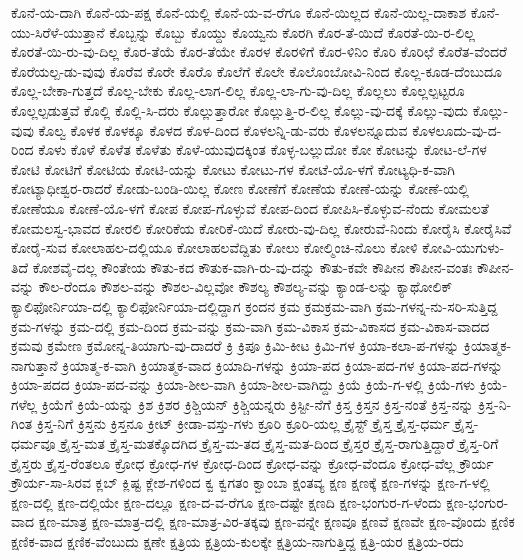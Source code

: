ಕೊನೆ-ಯ-ದಾಗಿ
ಕೊನೆ-ಯ-ಪಕ್ಷ
ಕೊನೆ-ಯಲ್ಲಿ
ಕೊನೆ-ಯ-ವ-ರೆಗೂ
ಕೊನೆ-ಯಿಲ್ಲದ
ಕೊನೆ-ಯಿಲ್ಲ-ದಾಕಾಶ
ಕೊನೆ-ಯು-ಸಿರೆಳೆ-ಯುತ್ತಾನೆ
ಕೊಬ್ಬನ್ನು
ಕೊಬ್ಬು
ಕೊಯ್ದು
ಕೊಯ್ವನು
ಕೊರಗಿ
ಕೊರ-ತೆ-ಯಿದೆ
ಕೊರತೆ-ಯಿ-ರ-ಲಿಲ್ಲ
ಕೊರತೆ-ಯಿ-ರು-ವು-ದಿಲ್ಲ
ಕೊರ-ತೆಯೆ
ಕೊರ-ತೆಯೇ
ಕೊರಳ
ಕೊರಳಿಗೆ
ಕೊರ-ಳಿನಿಂ
ಕೊರಿ
ಕೊರಿಛೆ
ಕೊರೆತ-ವೆಂದರೆ
ಕೊರೆಯಲ್ಪ-ಡು-ವುವು
ಕೊರೆವ
ಕೊರೇ
ಕೊರೊ
ಕೊಲೆಗೆ
ಕೊಲೇ
ಕೊಲೊಂಬೋವಿ-ನಿಂದ
ಕೊಲ್ಲ-ಕೂಡ-ದೆಂಬುದೂ
ಕೊಲ್ಲ-ಬೇಕಾ-ಗುತ್ತದೆ
ಕೊಲ್ಲ-ಬೇಕು
ಕೊಲ್ಲ-ಲಾಗ-ಲಿಲ್ಲ
ಕೊಲ್ಲ-ಲಾ-ಗು-ವು-ದಿಲ್ಲ
ಕೊಲ್ಲಲು
ಕೊಲ್ಲಲ್ಪಟ್ಟರೂ
ಕೊಲ್ಲಲ್ಪಡುತ್ತವೆ
ಕೊಲ್ಲಿ
ಕೊಲ್ಲಿ-ಸಿ-ದರು
ಕೊಲ್ಲುತ್ತಾರೋ
ಕೊಲ್ಲುತ್ತಿ-ರ-ಲಿಲ್ಲ
ಕೊಲ್ಲು-ವು-ದಕ್ಕೆ
ಕೊಲ್ಲು-ವುದು
ಕೊಲ್ಲು-ವುವು
ಕೊಲ್ವ
ಕೊಳಕ
ಕೊಳಕ್ಕೂ
ಕೊಳದ
ಕೊಳ-ದಿಂದ
ಕೊಳಲನ್ನಿ-ಡು-ವರು
ಕೊಳಲನ್ನೂದುವ
ಕೊಳಲೂದು-ವು-ದ-ರಿಂದ
ಕೊಳು
ಕೊಳೆ
ಕೊಳೆತ
ಕೊಳೆತು
ಕೊಳೆ-ಯುವುದಕ್ಕಿಂತ
ಕೊಳ್ಳ-ಬಲ್ಲುದೋ
ಕೋ
ಕೋಟನ್ನು
ಕೋಟ-ಲೆ-ಗಳ
ಕೋಟಿ
ಕೋಟಿಗೆ
ಕೋಟಿಯ
ಕೋಟಿ-ಯನ್ನು
ಕೋಟು
ಕೋಟು-ಗಳ
ಕೋಟೆ-ಯೊ-ಳಗೆ
ಕೋಟ್ಯಧಿ-ಕ-ವಾಗಿ
ಕೋಟ್ಯಾಧೀಶ್ವರ-ರಾದರೆ
ಕೋಡು-ಬಂಡಿ-ಯಿಲ್ಲ
ಕೋಣ
ಕೋಣೆಗೆ
ಕೋಣೆಯ
ಕೋಣೆ-ಯನ್ನು
ಕೋಣೆ-ಯಲ್ಲಿ
ಕೋಣೆಯೂ
ಕೋಣೆ-ಯೊ-ಳಗೆ
ಕೋಪ
ಕೋಪ-ಗೊಳ್ಳುವೆ
ಕೋಪ-ದಿಂದ
ಕೋಪಿಸಿ-ಕೊಳ್ಳುವ-ನೆಂದು
ಕೋಮಲತೆ
ಕೋಮಲಸ್ವ-ಭಾವದ
ಕೋರಲಿ
ಕೋರಿಕೆಯ
ಕೋರಿಕೆ-ಯಿದೆ
ಕೋರು-ವು-ದಿಲ್ಲ
ಕೋರುವೆ-ನಿಂದು
ಕೋರೈಸಿ
ಕೋರೈಸಿವೆ
ಕೋರೈ-ಸುವ
ಕೋಲಾಹಲ-ದಲ್ಲಿಯೂ
ಕೋಲಾಹಲವೆದ್ದಿತು
ಕೋಲು
ಕೋಲ್ಮಿಂಚಿ-ನೊಲು
ಕೋಳಿ
ಕೋವಿ-ಯುಗುಳು-ತಿದೆ
ಕೋಶವೈ-ದಲ್ಲ
ಕೌಂತೇಯ
ಕೌತು-ಕದ
ಕೌತುಕ-ವಾಗಿ-ರು-ವು-ದನ್ನು
ಕೌತು-ಕವೇ
ಕೌಪೀನ
ಕೌಪೀನ-ವಂತಃ
ಕೌಪೀನ-ವನ್ನು
ಕೌಲ-ರೆಂದೂ
ಕೌಶಲ-ವನ್ನು
ಕೌಶಲ-ವಿಲ್ಲವೋ
ಕೌಶಲ್ಯ
ಕೌಶಲ್ಯ-ವನ್ನು
ಕ್ಯಾಂಡ-ಲನ್ನು
ಕ್ಯಾಥೋಲಿಕ್
ಕ್ಯಾಲಿಫೋರ್ನಿಯಾ-ದಲ್ಲಿ
ಕ್ಯಾಲಿಫೋರ್ನಿಯಾ-ದಲ್ಲಿದ್ದಾಗ
ಕ್ರಂದನ
ಕ್ರಮ
ಕ್ರಮಕ್ರಮ-ವಾಗಿ
ಕ್ರಮ-ಗಳನ್ನ-ನು-ಸರಿ-ಸುತ್ತಿದ್ದ
ಕ್ರಮ-ಗಳನ್ನು
ಕ್ರಮ-ದಲ್ಲಿ
ಕ್ರಮ-ದಿಂದ
ಕ್ರಮ-ವನ್ನು
ಕ್ರಮ-ವಾಗಿ
ಕ್ರಮ-ವಿಕಾಸ
ಕ್ರಮ-ವಿಕಾಸದ
ಕ್ರಮ-ವಿಕಾಸ-ವಾದದ
ಕ್ರಮವು
ಕ್ರಮೇಣ
ಕ್ರಮೋನ್ನ-ತಿಯಾಗು-ವು-ದಾದರೆ
ಕ್ರಿ
ಕ್ರಿಪೂ
ಕ್ರಿಮಿ-ಕೀಟ
ಕ್ರಿಮಿ-ಗಳ
ಕ್ರಿಯಾ-ಕಲಾ-ಪ-ಗಳನ್ನು
ಕ್ರಿಯಾತ್ಮಕ-ನಾಗುತ್ತಾನೆ
ಕ್ರಿಯಾತ್ಮ-ಕ-ವಾಗಿ
ಕ್ರಿಯಾತ್ಮಕ-ವಾದ
ಕ್ರಿಯಾದಿ-ಗಳನ್ನು
ಕ್ರಿಯಾ-ಪದ
ಕ್ರಿಯಾ-ಪದ-ಗಳ
ಕ್ರಿಯಾ-ಪದ-ಗಳನ್ನು
ಕ್ರಿಯಾ-ಪದದ
ಕ್ರಿಯಾ-ಪದ-ವನ್ನು
ಕ್ರಿಯಾ-ಶೀಲ-ವಾಗಿ
ಕ್ರಿಯಾ-ಶೀಲ-ವಾಗಿದ್ದು
ಕ್ರಿಯೆ
ಕ್ರಿಯೆ-ಗ-ಳಲ್ಲಿ
ಕ್ರಿಯೆ-ಗಳು
ಕ್ರಿಯೆ-ಗಳೆಲ್ಲ
ಕ್ರಿಯೆಗೆ
ಕ್ರಿಯೆ-ಯನ್ನು
ಕ್ರಿಶ
ಕ್ರಿಶರ
ಕ್ರಿಶ್ಚಿಯನ್
ಕ್ರಿಶ್ಚಿಯನ್ನರು
ಕ್ರಿಸ್ಟೀ-ನೆಗೆ
ಕ್ರಿಸ್ತ
ಕ್ರಿಸ್ತನ
ಕ್ರಿಸ್ತ-ನಂತೆ
ಕ್ರಿಸ್ತ-ನನ್ನು
ಕ್ರಿಸ್ತ-ನಿ-ಗಿಂತ
ಕ್ರಿಸ್ತ-ನಿಗೆ
ಕ್ರಿಸ್ತನು
ಕ್ರಿಸ್ತನೂ
ಕ್ರೀಟ್
ಕ್ರೀಡಾ-ವಸ್ತು-ಗಳು
ಕ್ರೂರಿ
ಕ್ರೂರಿ-ಯಲ್ಲ
ಕ್ರೈಸ್ಟ್
ಕ್ರೈಸ್ತ
ಕ್ರೈಸ್ತ-ಧರ್ಮ
ಕ್ರೈಸ್ತ-ಧರ್ಮವೂ
ಕ್ರೈಸ್ತ-ಮತ
ಕ್ರೈಸ್ತ-ಮತಕ್ಕೊದಗಿದ
ಕ್ರೈಸ್ತ-ಮ-ತದ
ಕ್ರೈಸ್ತ-ಮತ-ದಿಂದ
ಕ್ರೈಸ್ತರ
ಕ್ರೈಸ್ತ-ರಾಗುತ್ತಿದ್ದಾರೆ
ಕ್ರೈಸ್ತ-ರಿಗೆ
ಕ್ರೈಸ್ತರು
ಕ್ರೈಸ್ತ-ರೆಂತಲೂ
ಕ್ರೋಧ
ಕ್ರೋಧ-ಗಳ
ಕ್ರೋಧ-ದಿಂದ
ಕ್ರೋಧ-ವನ್ನು
ಕ್ರೋಧ-ವೆಂದೂ
ಕ್ರೋಧ-ವೆಲ್ಲ
ಕ್ರೌರ್ಯ
ಕ್ರೌರ್ಯ-ಸಾ-ಸಿರವ
ಕ್ಲಬ್
ಕ್ಲಿಷ್ಟ
ಕ್ಲೇಶ-ಗಳಿಂದ
ಕ್ವ
ಕ್ವಗತಂ
ಕ್ವಾಂಬಾ
ಕ್ಷಂತವ್ಯ
ಕ್ಷಣ
ಕ್ಷಣಕ್ಕೆ
ಕ್ಷಣ-ಗಳನ್ನು
ಕ್ಷಣ-ಗ-ಳಲ್ಲಿ
ಕ್ಷಣ-ದಲ್ಲಿ
ಕ್ಷಣ-ದಲ್ಲಿಯೇ
ಕ್ಷಣ-ದಲ್ಲೂ
ಕ್ಷಣ-ದ-ವ-ರೆಗೂ
ಕ್ಷಣ-ದಷ್ಟೇ
ಕ್ಷಣದಿ
ಕ್ಷಣ-ಭಂಗುರ-ಗ-ಳೆಂದು
ಕ್ಷಣ-ಭಂಗುರ-ವಾದ
ಕ್ಷಣ-ಮಾತ್ರ
ಕ್ಷಣ-ಮಾತ್ರ-ದಲ್ಲಿ
ಕ್ಷಣ-ಮಾತ್ರ-ವಿರ-ತಕ್ಕವು
ಕ್ಷಣ-ವನ್ನೇ
ಕ್ಷಣವೂ
ಕ್ಷಣವೆ
ಕ್ಷಣವೇ
ಕ್ಷಣ-ವೊಂದು
ಕ್ಷಣಿಕ
ಕ್ಷಣಿಕ-ವಾದ
ಕ್ಷಣಿಕ-ವೆಂಬುದು
ಕ್ಷಣೇ
ಕ್ಷತ್ರಿಯ
ಕ್ಷತ್ರಿಯ-ಕುಲಕ್ಕೇ
ಕ್ಷತ್ರಿಯ-ನಾಗುತ್ತಿದ್ದ
ಕ್ಷತ್ರಿ-ಯರ
ಕ್ಷತ್ರಿಯ-ರದು
